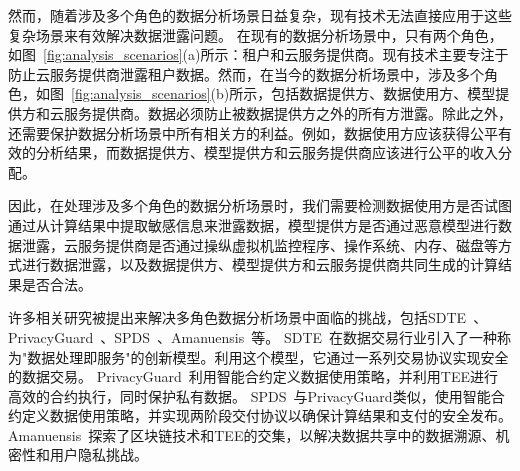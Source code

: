 然而，随着涉及多个角色的数据分析场景日益复杂，现有技术无法直接应用于这些复杂场景来有效解决数据泄露问题。
在现有的数据分析场景中，只有两个角色，如图~\ref{fig:analysis_scenarios}(a)所示：租户和云服务提供商。现有技术主要专注于防止云服务提供商泄露租户数据。然而，在当今的数据分析场景中，涉及多个角色，如图~\ref{fig:analysis_scenarios}(b)所示，包括数据提供方、数据使用方、模型提供方和云服务提供商。数据必须防止被数据提供方之外的所有方泄露。除此之外，还需要保护数据分析场景中所有相关方的利益。例如，数据使用方应该获得公平有效的分析结果，而数据提供方、模型提供方和云服务提供商应该进行公平的收入分配。

因此，在处理涉及多个角色的数据分析场景时，我们需要检测数据使用方是否试图通过从计算结果中提取敏感信息来泄露数据，模型提供方是否通过恶意模型进行数据泄露，云服务提供商是否通过操纵虚拟机监控程序、操作系统、内存、磁盘等方式进行数据泄露，以及数据提供方、模型提供方和云服务提供商共同生成的计算结果是否合法。

许多相关研究被提出来解决多角色数据分析场景中面临的挑战，包括SDTE~\cite{dai2019sdte}、PrivacyGuard~\cite{xiao2020privacyguard}、SPDS~\cite{wang2020spds}、Amanuensis~\cite{hardin2022amanuensis}等。
SDTE~\cite{dai2019sdte}在数据交易行业引入了一种称为"数据处理即服务"的创新模型。利用这个模型，它通过一系列交易协议实现安全的数据交易。
PrivacyGuard~\cite{xiao2020privacyguard}利用智能合约定义数据使用策略，并利用TEE进行高效的合约执行，同时保护私有数据。
SPDS~\cite{wang2020spds}与PrivacyGuard类似，使用智能合约定义数据使用策略，并实现两阶段交付协议以确保计算结果和支付的安全发布。
Amanuensis~\cite{hardin2022amanuensis}探索了区块链技术和TEE的交集，以解决数据共享中的数据溯源、机密性和用户隐私挑战。

